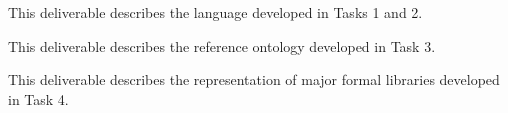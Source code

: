 \begin{workpackage}
\begin{tasklist}


\end{tasklist}


\begin{wpdelivs}
  \begin{wpdeliv}[due=28,id=deliv-str-framework,dissem=PU,nature=R,lead=Sac]
  	{This deliverable describes the language developed in Tasks 1 and 2.}
  \end{wpdeliv}
  \begin{wpdeliv}[due=36,id=deliv-str-ontology,dissem=PU,nature=R,lead=Sac]
  	{This deliverable describes the reference ontology developed in Task 3.}
  \end{wpdeliv}
  \begin{wpdeliv}[due=48,id=deliv-str-libraries,dissem=PU,nature=R,lead=Fau]
  	{This deliverable describes the representation of major formal libraries developed in Task 4.}
  \end{wpdeliv}
\end{wpdelivs}



\end{workpackage}
